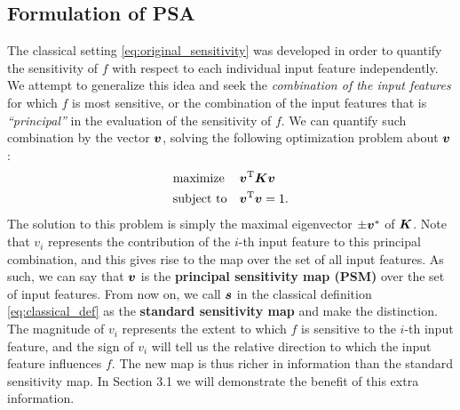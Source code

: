\subsection{Formulation of PSA}
%
The classical setting \eqref{eq:original_sensitivity} was developed
in order to quantify the sensitivity of $f$ with respect
to each individual input feature independently.
%
We attempt to generalize this idea and seek the \textit{combination
of the input features} for which $f$ is most sensitive, or the combination of the input features that is
\textit{``principal''} in the evaluation of the sensitivity of $f$.
%
We can quantify such combination by the vector $\mbox{\boldmath $v$}$, solving the following
optimization problem about $\mbox{\boldmath $v$}$:
%
\begin{align}
  \begin{split}
\begin{aligned}
& \text{maximize}
& & \mbox{\boldmath $v$}^{\mathrm{T}} \mbox{\boldmath $K$} \mbox{\boldmath $v$} \\
& \text{subject to}
& & \mbox{\boldmath $v$}^{\mathrm{T}}\mbox{\boldmath $v$} = 1.
\end{aligned}
 \end{split} \label{def:psm}
\end{align}
%
The solution to this problem is simply the maximal eigenvector
$\pm\mbox{\boldmath $v$}^{*}$ of $\mbox{\boldmath $K$}$.
%
Note that $v_i$ represents the contribution of the $i$-th input feature to this principal
combination, and this gives rise to the map over the set of all input features.
As such, we can say that $\mbox{\boldmath $v$}$ is the \textbf{principal sensitivity map
(PSM)} over the set of input features.
%
From now on, we call $\mbox{\boldmath $s$}$ in the classical definition
\eqref{eq:classical_def} as the \textbf{standard sensitivity map} and
make the distinction.
%
The magnitude of $v_i$ represents the extent
to which $f$ is sensitive to the $i$-th input feature,
and the sign of $v_i$ will tell us the relative direction
to which the input feature influences $f$.
%
The new map is thus richer in information than the standard
sensitivity map.
%
In Section 3.1 we will demonstrate the benefit of this extra
information.

